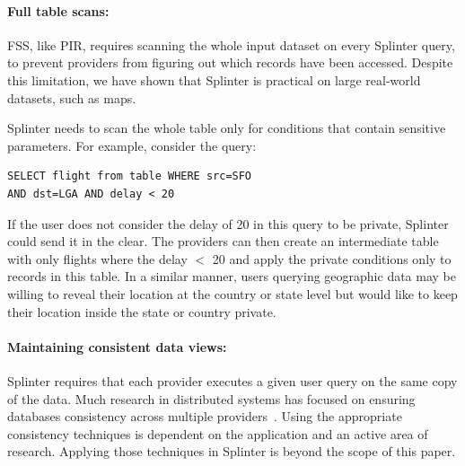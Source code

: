 

\paragraph{Full table scans:}
FSS, like PIR, requires scanning the whole input dataset on every Splinter query,
to prevent providers from figuring out which records have been accessed. 
Despite this limitation, we have shown that Splinter is practical
on large real-world datasets, such as maps.

Splinter needs to scan the whole table only for conditions 
that contain sensitive parameters.
For example, consider the query:
\begin{verbatim}
SELECT flight from table WHERE src=SFO 
AND dst=LGA AND delay < 20
\end{verbatim}
If the user does not consider the delay of 20 in this query to be
private, Splinter could send it in the clear.
The providers can then create an intermediate
table with only flights where the delay $<$ 20 and apply the private
conditions only to records in this table.
In a similar manner, users querying geographic data may be willing to
reveal their location at the country or state level but would like to
keep their location inside the state or country private.

\paragraph{Maintaining consistent data views:}
Splinter requires that each provider executes a given user
query on the same copy of the data. 
Much research in distributed systems has focused on ensuring
databases consistency across multiple providers~\cite{spanner, ongaro:raft, tu:silo}.
Using the appropriate consistency techniques is dependent
on the application and an active area of research.
Applying those techniques in Splinter is beyond the scope
of this paper.


